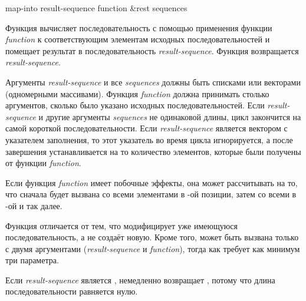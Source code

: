 \begin{defun}[Функция]
map-into result-sequence function &rest sequences

Функция  вычисляет последовательность с помощью применения функции
\emph{function} к соответствующим элементам исходных последовательностей и
помещает результат в последовательность \emph{result-sequence}.
Функция возвращается \emph{result-sequence}.

Аргументы \emph{result-sequence} и все \emph{sequences} должны быть списками
или векторами (одномерными массивами).
Функция \emph{function} должна принимать столько аргументов, сколько было
указано исходных последовательностей.
Если \emph{result-sequence} и другие аргументы \emph{sequences} не одинаковой
длины, цикл закончится на самой короткой последовательности. Если
\emph{result-sequence} является вектором с указателем заполнения, то этот
указатель во время цикла игнорируется, а после завершения устанавливается на то
количество элементов, которые были получены от функции \emph{function}.

Если функция \emph{function} имеет побочные эффекты, она может рассчитывать на
то, что сначала будет вызвана со всеми элементами в -ой позиции, затем со
всеми в -ой и так далее.

Функция  отличается от  тем, что модифицирует уже
имеющуюся последовательность, а не создаёт новую. Кроме того, 
может быть вызвана только с двумя аргументами (\emph{result-sequence} и
\emph{function}), тогда как  требует как минимум три параметра.

Если \emph{result-sequence} является ,  немедленно
возвращает , потому что длина  последовательности равняется
нулю.
\end{defun}


